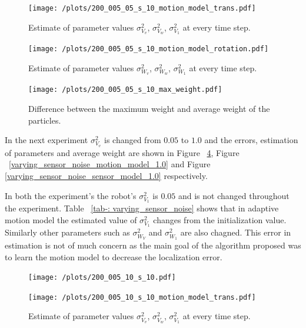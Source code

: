 \documentclass[12pt,draft]{dalcsthesis}
\begin{document}
   
\begin{figure}
  \centering
     {\texttt{[image: /plots/200\_005\_05\_s\_10\_motion\_model\_trans.pdf]}}
  \caption{\label{fig-varying_sensor_noise_motion_model} Estimate of parameter values $\sigma_{V_{v}}^{2}$, $\sigma_{V_{w}}^{2}$,  $\sigma_{V_{1}}^{2}$ at every time step.}
\end{figure}

\begin{figure}
  \centering
     {\texttt{[image: /plots/200\_005\_05\_s\_10\_motion\_model\_rotation.pdf]}}
  \caption{\label{fig-varying_sensor_noise_motion_model} Estimate of parameter values $\sigma_{W_{v}}^{2}$, $\sigma_{W_{w}}^{2}$, $\sigma_{W_{1}}^{2}$ at every time step.}
\end{figure}

\begin{figure}
  \centering
     {\texttt{[image: /plots/200\_005\_05\_s\_10\_max\_weight.pdf]}}
  \caption{\label{fig-varying_sensor_noise_sensor_model} Difference between the maximum weight and average weight of the particles.}
\end{figure}

In the next experiment $\sigma_{V_{v}}^2$ is changed from $0.05$ to $1.0$ and the errors, estimation of parameters and average weight are shown in Figure ~\ref{fig-varying_sensor_noise_1.0}, Figure ~\ref{varying_sensor_noise_motion_model_1.0} and Figure \ref{varying_sensor_noise_sensor_model_1.0} respectively. 

In both the experiment's the robot's $\sigma_{V_{1}}^2$ is $0.05$ and is not changed throughout the experiment. Table ~\ref{tab-: varying_sensor_noise} shows that in adaptive motion model the estimated value of $\sigma_{V_{1}}^2$ changes from the initialization value. Similarly other parameters such as $\sigma_{W_{V}}^2$ and $\sigma_{W_{1}}^2$ are also chagned. This error in estimation is not of much concern as the main goal of the algorithm proposed was to learn the motion model to decrease the localization error. 

\begin{figure}
  \centering
     {\texttt{[image: /plots/200\_005\_10\_s\_10.pdf]}}
  \caption{\label{fig-varying_sensor_noise_1.0} }
\end{figure}
   
   
\begin{figure}
  \centering
     {\texttt{[image: /plots/200\_005\_10\_s\_10\_motion\_model\_trans.pdf]}}
  \caption{\label{fig-varying_sensor_noise_motion_model_1.0}Estimate of parameter values $\sigma_{V_{v}}^{2}$, $\sigma_{V_{w}}^{2}$,  $\sigma_{V_{1}}^{2}$ at every time step. }
\end{figure}
\end{document}
